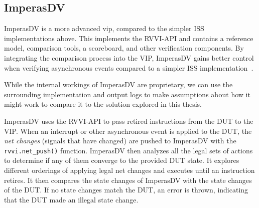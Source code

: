%    


\subsection{ImperasDV}
\label{sec:imperasdv}

ImperasDV is a more advanced \acrfull{vip}, compared to the simpler ISS implementations above. This implements the RVVI-API and contains a reference model, comparison tools, a scoreboard, and other verification components. By integrating the comparison process into the VIP, ImperasDV gains better control when verifying asynchronous events compared to a simpler ISS implementation~\cite{taylorAdvancedRISCVVerification2023}. 

While the internal workings of ImperasDV are proprietary, we can use the surrounding implementation and output logs \cite{ISSMismatchPending2023} to make assumptions about how it might work to compare it to the solution explored in this thesis.

ImperasDV uses the RVVI-API to pass retired instructions from the DUT to the VIP. When an interrupt or other asynchronous event is applied to the DUT, the \textit{net changes} (signals that have changed) are pushed to ImperasDV with the \lstinline{rvvi.net_push()} function. ImperasDV then analyzes all the legal sets of actions to determine if any of them converge to the provided DUT state. 
It explores different orderings of applying legal net changes and executes until an instruction retires. It then compares the state changes of ImperasDV with the state changes of the DUT. If no state changes match the DUT, an error is thrown, indicating that the DUT made an illegal state change.

